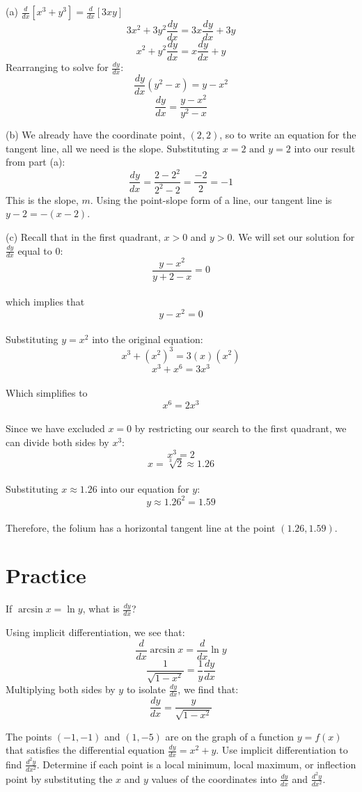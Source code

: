 (a) $\frac{d}{dx}[x^3+y^3]=\frac{d}{dx}[3xy]$
$$3x^2+3y^2\frac{dy}{dx}=3x\frac{dy}{dx}+3y$$
$$x^2+y^2\frac{dy}{dx}=x\frac{dy}{dx}+y$$
Rearranging to solve for $\frac{dy}{dx}$:
$$\frac{dy}{dx}(y^2-x)=y-x^2$$
$$\frac{dy}{dx}=\frac{y-x^2}{y^2-x}$$

(b) We already have the coordinate point, $(2, 2)$, so to write an 
equation for the tangent line, all we need is the slope. Substituting 
$x=2 \text{ and }y=2$ into our result from part (a):
$$\frac{dy}{dx}=\frac{2-2^2}{2^2-2}=\frac{-2}{2}=-1$$
This is the slope, $m$. Using the point-slope form of a line, our 
tangent line is $y-2=-(x-2)$. 

(c) Recall that in the first quadrant, $x > 0$ and $y > 0$. We will 
set our solution for $\frac{dy}{dx}$  equal to 0:
$$\frac{y-x^2}{y+2-x} = 0$$ \\
which implies that $$y - x^2 = 0$$ \\
Substituting $y = x^2$ into the original equation: 
$$x^3 + (x^2)^3 = 3(x)(x^2)$$ 
$$x^3 + x^6 = 3x^3$$ \\
Which simplifies to 
$$x^6 = 2x^3$$\\
Since we have excluded $x = 0$ by restricting our search to the first 
quadrant, we can divide both sides by $x^3$: 
$$x^3 = 2$$ 
$$x = \sqrt[3]{2} \approx 1.26$$\\
Substituting $x \approx 1.26$ into our equation for $y$: 
$$y \approx 1.26^2 = 1.59$$\\ 
Therefore, the folium has a horizontal tangent line at the point 
$(1.26, 1.59)$.

\section{Practice}
\begin{Exercise} If 
	$\arcsin{x} = \ln{y}$, what is $\frac{dy}{dx}$?
\end{Exercise}

\begin{Answer}[ref=implicit1]
	Using implicit differentiation, we see that:
	$$\frac{d}{dx}\arcsin{x} = \frac{d}{dx}\ln{y}$$
	$$\frac{1}{\sqrt{1-x^2}} = \frac{1}{y}\frac{dy}{dx}$$
	Multiplying both sides by $y$ to isolate $\frac{dy}{dx}$, we find that:
	$$\frac{dy}{dx} = \frac{y}{\sqrt{1-x^2}}$$
\end{Answer}

\begin{Exercise} The points 
	$(-1, -1)$ and $(1, -5)$ are on the graph of a function $y = f(x)$ 
	that satisfies the differential equation $\frac{dy}{dx} = x^2 + y$. 
	Use implicit differentiation to find $\frac{d^2y}{dx^2}$. Determine 
	if each point is a local minimum, local maximum, or inflection point 
	by substituting the $x$ and $y$ values of the coordinates into 
	$\frac{dy}{dx}$ and $\frac{d^2y}{dx^2}$. 
\end{Exercise}

